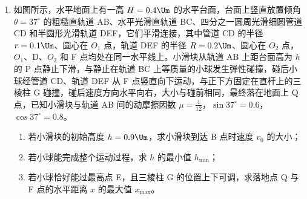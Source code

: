 \documentclass[\gkver]{gaokaozhenti}
\begin{document}
\begin{enumerate}


\item
如图所示，水平地面上有一高 $H=0.4\Um$ 的水平台面，台面上竖直放置倾角 $\theta=37^\circ$ 的粗糙直轨道 AB、水平光滑直轨道 BC、四分之一圆周光滑细圆管道 CD 和半圆形光滑轨道 DEF，它们平滑连接，其中管道 CD 的半径 $r=0.1\Um$、圆心在 $O_1$ 点，轨道 DEF 的半径 $R=0.2\Um$、圆心在 $O_2$ 点，$O_1$、D、$O_2$ 和 F 点均处在同一水平线上。小滑块从轨道 AB 上距台面高为 $h$ 的 P 点静止下滑，与静止在轨道 BC 上等质量的小球发生弹性碰撞，碰后小球经管道 CD、轨道 DEF 从 F 点竖直向下运动，与正下方固定在直杆上的三棱柱 G 碰撞，碰后速度方向水平向右，大小与碰前相同，最终落在地面上 Q 点，已知小滑块与轨道 AB 间的动摩擦因数 $\mu=\frac{1}{12}$，$\sin37^\circ=0.6$，$\cos37^\circ=0.8$。

\begin{enumerate}
	\item
	若小滑块的初始高度 $h=0.9\Um$，求小滑块到达 B 点时速度 $v_0$ 的大小；
	\item
	若小球能完成整个运动过程，求 $h$ 的最小值 $h_{\min}$；
	\item
	若小球恰好能过最高点 E，且三棱柱 G 的位置上下可调，求落地点 Q 与 F 点的水平距离 $x$ 的最大值 $x_{\max}$。
\end{enumerate}


\end{enumerate}
\end{document}
